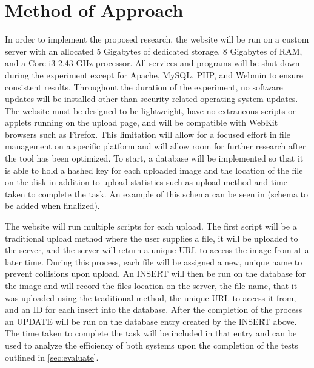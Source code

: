 \documentclass[11pt]{article}
\begin{document}
\section{Method of Approach}
\label{sec:method}
\vspace*{-.1in}

In order to implement the proposed research, the website will be run on a custom server with an allocated 5 Gigabytes of dedicated storage, 8 Gigabytes of RAM, and a Core i3 2.43 GHz processor. All services and programs will be shut down during the experiment except for Apache, MySQL, PHP, and Webmin to ensure consistent results. Throughout the duration of the experiment, no software updates will be installed other than security related operating system updates. The website must be designed to be lightweight, have no extraneous scripts or applets running on the upload page, and will be compatible with WebKit browsers such as Firefox. This limitation will allow for a focused effort in file management on a specific platform and will allow room for further research after the tool has been optimized. To start, a database will be implemented so that it is able to hold a hashed key for each uploaded image and the location of the file on the disk in addition to upload statistics such as upload method and time taken to complete the task. An example of this schema can be seen in (schema to be added when finalized). %

The website will run multiple scripts for each upload. The first script will be a traditional upload method where the user supplies a file, it will be uploaded to the server, and the server will return a unique URL to access the image from at a later time. During this process, each file will be assigned a new, unique name to prevent collisions upon upload. An INSERT will then be run on the database for the image and will record the files location on the server, the file name, that it was uploaded using the traditional method, the unique URL to access it from, and an ID for each insert into the database. After the completion of the process an UPDATE will be run on the database entry created by the INSERT above. The time taken to complete the task will be included in that entry and can be used to analyze the efficiency of both systems upon the completion of the tests outlined in \ref{sec:evaluate}.
\end{document}

